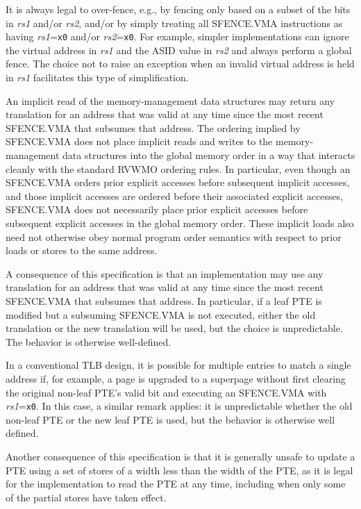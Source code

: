 \begin{commentary}
It is always legal to over-fence, e.g., by fencing only based on a subset
of the bits in {\em rs1} and/or {\em rs2}, and/or by simply treating all
SFENCE.VMA instructions as having {\em rs1}={\tt x0} and/or
{\em rs2}={\tt x0}.  For example, simpler implementations can ignore the
virtual address in {\em rs1} and the ASID value in {\em rs2} and always perform
a global fence.  The choice not to raise an exception when an invalid virtual
address is held in {\em rs1} facilitates this type of simplification.
\end{commentary}

An implicit read of the memory-management data structures may return any
translation for an address that was valid at
any time since the most recent SFENCE.VMA that subsumes that address.  The
ordering implied by SFENCE.VMA does not place implicit reads and writes to the
memory-management data structures into the global memory order in a way that
interacts cleanly with the standard RVWMO ordering rules.  In particular, even
though an SFENCE.VMA orders prior explicit accesses before subsequent implicit
accesses, and those implicit accesses are ordered before their associated
explicit accesses, SFENCE.VMA does not necessarily place prior explicit
accesses before subsequent explicit accesses in the global memory order.  These
implicit loads also need not otherwise obey normal program order semantics with
respect to prior loads or stores to the same address.

\begin{commentary}
A consequence of this specification is that an implementation may use any
translation for an address that was valid at any time since the most recent
SFENCE.VMA that subsumes that address.
In particular, if a leaf PTE is modified but a subsuming SFENCE.VMA is not
executed, either the old translation or the new translation will be used, but
the choice is unpredictable.
The behavior is otherwise well-defined.

In a conventional TLB design, it is possible for multiple entries to match a
single address if, for example, a page is upgraded to a superpage without first
clearing the original non-leaf PTE's valid bit and executing an SFENCE.VMA with
{\em rs1}={\tt x0}.
In this case, a similar remark applies: it is unpredictable whether the old
non-leaf PTE or the new leaf PTE is used, but the behavior is otherwise well
defined.

Another consequence of this specification is that it is generally unsafe to
update a PTE using a set of stores of a width less than the width of the PTE,
as it is legal for the implementation to read the PTE at any time, including
when only some of the partial stores have taken effect.
\end{commentary}

